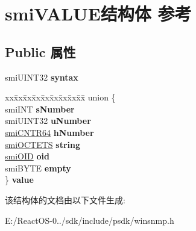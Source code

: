 \hypertarget{structsmi_v_a_l_u_e}{}\section{smi\+V\+A\+L\+U\+E结构体 参考}
\label{structsmi_v_a_l_u_e}
\subsection*{Public 属性}
\begin{DoxyCompactItemize}
\item 
\mbox{\label{structsmi_v_a_l_u_e_ae07bc4a33bb3103266f8c20138898cfb}} 
smi\+U\+I\+N\+T32 {\bfseries syntax}
\item 
\mbox{\label{structsmi_v_a_l_u_e_a21c7eb2c522c041f5327becb43e65479}} 
\begin{tabbing}
xx\=xx\=xx\=xx\=xx\=xx\=xx\=xx\=xx\=\kill
union \{\\
\>smiINT {\bfseries sNumber}\\
\>smiUINT32 {\bfseries uNumber}\\
\>\hyperlink{structsmi_c_n_t_r64}{smiCNTR64} {\bfseries hNumber}\\
\>\hyperlink{structsmi_o_c_t_e_t_s}{smiOCTETS} {\bfseries string}\\
\>\hyperlink{structsmi_o_i_d}{smiOID} {\bfseries oid}\\
\>smiBYTE {\bfseries empty}\\
\} {\bfseries value}\\

\end{tabbing}\end{DoxyCompactItemize}


该结构体的文档由以下文件生成\+:\begin{DoxyCompactItemize}
\item 
E\+:/\+React\+O\+S-\/0../sdk/include/psdk/winsnmp.\+h\end{DoxyCompactItemize}

